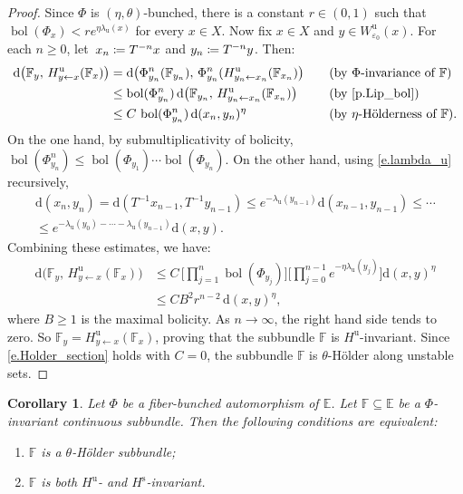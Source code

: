 \documentclass[JEP,XML,SOM,Unicode]{cedram}
\def\vcentcolon{\mathrel{\mathop\ordinarycolon}}
\providecommand\ordinarycolon{:}
\providecommand*\coloneqq{\vcentcolon\mathrel{\mkern-1.2mu}=}
\theoremstyle{plain}
\newtheorem{corollary}[theorem]{Corollary}
\theoremstyle{definition}
\newcommand{\EE}{\mathbb{E}}
\newcommand{\FF}{\mathbb{F}}
\newcommand{\dd}{\mathrm{d}}
\newcommand{\uu}{\mathrm{u}}
\renewcommand{\ss}{\mathrm{s}}
\DeclareMathOperator{\bol}{bol}
\let\epsilon\varepsilon
\begin{document}
\begin{proof}
Since $\Phi$ is $(\eta,\theta)$-bunched, there is a constant $r \in (0,1)$ such that $\bol(\Phi_x) < r e^{\eta \lambda_\uu(x)}$ for every $x \in X$.
Now fix $x \in X$ and $y \in W^\uu_{\epsilon_0}(x)$.
For each $n \ge 0$, let~\hbox{$x_n \coloneqq T^{-n} x$} and $y_n \coloneqq T^{-n} y$.
Then:
\begin{alignat*}{2}
\dd \big (\FF_y, \, H^\uu_{y \gets x} (\FF_x) \big)
&= \dd \big (\Phi^n_{y_n}(\FF_{y_n}), \, \Phi^n_{y_n} (H^\uu_{y_n \gets x_n} (\FF_{x_n}) \big) &\quad&\text{(by $\Phi$-invariance of $\FF$)}\\
&\le \bol(\Phi^n_{y_n}) \, \dd \big (\FF_{y_n}, \, H^\uu_{y_n \gets x_n} (\FF_{x_n}) \big) &\quad&\text{(by \cref{p.Lip_bol})}\\
&\le C \, \bol(\Phi^n_{y_n}) \, \dd(x_n,y_n)^{\eta}
&\quad&\text{(by $\eta$-Hölderness of $\FF$).}
\end{alignat*}
On the one hand, by submultiplicativity of bolicity, $\bol(\Phi^n_{y_n}) \le \bol(\Phi_{y_1}) \cdots \bol(\Phi_{y_n})$.
On the other hand, using \eqref{e.lambda_u} recursively,
\begin{multline*}
\dd(x_n,y_n) = \dd(T^{-1} x_{n-1}, T^{-1} y_{n-1}) \le e^{-\lambda_\uu(y_{n-1})} \dd(x_{n-1}, y_{n-1}) \le \cdots \\ \le e^{-\lambda_\uu(y_0) - \cdots -\lambda_\uu(y_{n-1})} \dd(x,y).
\end{multline*}
Combining these estimates, we have:
\begin{align*}
\dd \big (\FF_y, \, H^\uu_{y \gets x} (\FF_x) \big)
&\le C \, \biggl[ \prod_{j=1}^{n} \bol(\Phi_{y_j})\biggr] \biggl[ \prod_{j=0}^{n-1} e^{-\eta \lambda_\uu(y_j)} \biggr] \dd(x,y)^{\eta} \\
&\le C B^2 r^{n-2} \, \dd(x,y)^{\eta},
\end{align*}
where $B \ge 1$ is the maximal bolicity.
As $n \to \infty$, the right hand side tends to zero.
So $\FF_y = H^\uu_{y \gets x} (\FF_x)$, proving that the subbundle $\FF$ is $H^\uu$-invariant.
Since \eqref{e.Holder_section} holds with $C=0$, the subbundle $\FF$ is $\theta$-Hölder along unstable sets.
\end{proof}

\begin{corollary}\label{c.irred}
Let $\Phi$ be a fiber-bunched automorphism of $\EE$.
Let $\FF \subseteq \EE$ be a $\Phi$-invariant continuous subbundle.
Then the following conditions are equivalent:
\begin{enumerate}
\item\label{i.irred1}
$\FF$ is a $\theta$-Hölder subbundle;
\item\label{i.irred2}
$\FF$ is both $H^\uu$- and $H^\ss$-invariant.
\end{enumerate}
\end{corollary}
\end{document}
